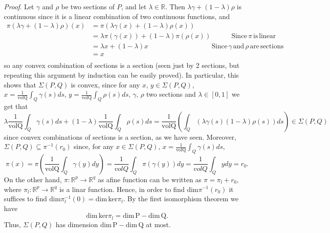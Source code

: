 \documentclass[12pt,a4paper]{article}
\begin{document}
\textit{Proof}. Let $\gamma$ and $\rho$ be two sections of $P$, and let $\lambda\in\mathbb{R}$. Then $\lambda\gamma+\left(1-\lambda\right)\rho$ is continuous since it is a linear combination of two continuous functions, and 
\begin{align*}
    \pi\left(\lambda\gamma+\left(1-\lambda\right)\rho\right)\left(x\right)&=\pi\left(\lambda\gamma\left(x\right)+\left(1-\lambda\right)\rho\left(x\right)\right)\\
    &=\lambda\pi\left(\gamma\left(x\right)\right)+\left(1-\lambda\right)\pi\left(\rho\left(x\right)\right)\quad\qquad\mathrm{Since\,}\pi\mathrm{\,is\,linear}\\
    &=\lambda x+\left(1-\lambda\right)x\qquad\qquad\qquad\qquad\quad\;\mathrm{Since\,}\gamma\mathrm{\,and\,}\rho\mathrm{\,are\,sections}\\
    &=x\\
\end{align*}
so any convex combination of sections is a section (seen just by 2 sections, but repeating this argument by induction can be easily proved). In particular, this shows that $\Sigma\left(P,Q\right)$ is convex, since for any $x$, $y\in\Sigma\left(P,Q\right)$, $x=\frac{1}{\mathrm{volQ}}\int_Q\gamma\left(s\right)ds$, $y=\frac{1}{\mathrm{volQ}}\int_Q\rho\left(s\right)ds$, $\gamma$, $\rho$ two sections and $\lambda\in\left[0,1\right]$ we get that
    $$\lambda\frac{1}{\mathrm{volQ}}\int_Q\gamma\left(s\right)ds+\left(1-\lambda\right)\frac{1}{\mathrm{volQ}}\int_Q\rho\left(s\right)ds=\frac{1}{\mathrm{volQ}}\left(\int_Q\left(\lambda\gamma\left(s\right)\left(1-\lambda\right)\rho\left(s\right)\right)ds\right)\in\Sigma\left(P,Q\right)$$
since convex combinations of sections is a section, as we have seen. Moreover, $\Sigma\left(P,Q\right)\subseteq\pi^{-1}\left(r_0\right)$ since, for any $x\in\Sigma\left(P,Q\right)$, $x=\frac{1}{\mathrm{volQ}}\int_Q\gamma\left(s\right)ds$, $$\pi\left(x\right)=\pi\left(\frac{1}{\mathrm{volQ}}\int_Q\gamma\left(y\right)dy\right)=\frac{1}{volQ}\int_Q\pi\left(\gamma\left(y\right)\right)dy=\frac{1}{volQ}\int_Qydy=r_0.$$ On the other hand, $\pi\colon\mathbb{R}^p\to\mathbb{R}^q$ as afine function can be written as $\pi=\pi_l+r_0$, where $\pi_l\colon\mathbb{R}^p\to \mathbb{R}^q$ is a linar function. Hence, in order to find $\mathrm{dim}\pi^{-1}\left(r_0\right)$ it suffices to find $\mathrm{dim}\pi^{-1}_l\left(0\right)=\mathrm{dim\,ker}\pi_l$. By the first isomorphism theorem we have $$\mathrm{dim\,ker}\pi_l=\mathrm{dim\,P}-\mathrm{dim\,Q}.$$ Thus, $\Sigma\left(P,Q\right)$ has dimension $\mathrm{dim\,P}-\mathrm{dim\,Q}$ at most.
\end{document}
